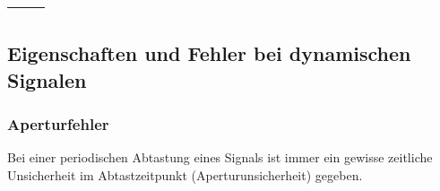 \begin{longtable}[c]{| p{6cm} | p{6cm} | p{6cm} | }
\begin{minipage}{6cm}
\begin{center}
\end{center}
\end{minipage}
 \\
\hline

\end{longtable}

\subsection{Eigenschaften und Fehler bei dynamischen Signalen}
\subsubsection{Aperturfehler} 
Bei einer periodischen Abtastung eines Signals ist immer ein gewisse zeitliche
Unsicherheit im Abtastzeitpunkt (Aperturunsicherheit) gegeben.


